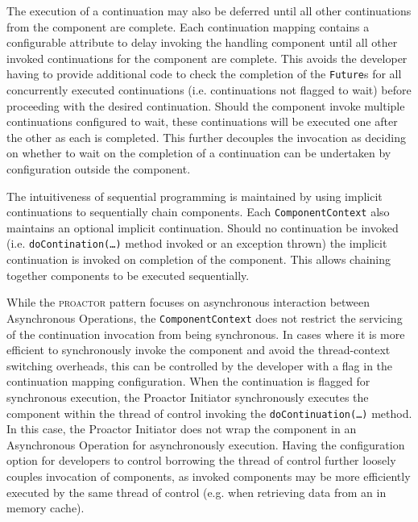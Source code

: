 \documentclass[prodmode]{style/acmlarge}
\begin{document}
The execution of a continuation may also be deferred until all other
continuations from the component are complete.  Each continuation mapping
contains a configurable attribute to delay invoking the handling component
until all other invoked continuations for the component are complete.  This
avoids the developer having to provide additional code to check the completion
of the \texttt{Future}s for all concurrently executed continuations (i.e.
continuations not flagged to wait) before proceeding with the desired
continuation.  Should the component invoke multiple continuations configured to
wait, these continuations will be executed one after the other as each is
completed.  This further decouples the invocation as deciding on whether to wait
on the completion of a continuation can be undertaken by configuration outside
the component.

The intuitiveness of sequential programming is maintained by using implicit
continuations \cite{continuations} to sequentially chain components.  Each
\texttt{ComponentContext} also maintains an optional implicit continuation. 
Should no continuation be invoked (i.e. \texttt{doContination(\ldots)} method
invoked or an exception thrown) the implicit continuation is invoked on
completion of the component.  This allows chaining together components to be
executed sequentially.

While the \textsc{proactor} pattern focuses on asynchronous interaction between
Asynchronous Operations, the \texttt{ComponentContext} does not restrict the
servicing of the continuation invocation from being synchronous.  In cases where
it is more efficient to synchronously invoke the component and avoid the
thread-context switching overheads, this can be controlled by the developer with
a flag in the continuation mapping configuration.  When the continuation is
flagged for synchronous execution, the Proactor Initiator synchronously executes
the component within the thread of control invoking the
\texttt{doContinuation(\ldots)} method.  In this case, the Proactor Initiator
does not wrap the component in an Asynchronous Operation for asynchronously
execution.  Having the configuration option for developers to control borrowing the
thread of control further loosely couples invocation of components, as invoked
components may be more efficiently executed by the same thread of control (e.g.
when retrieving data from an in memory cache).
\end{document}
